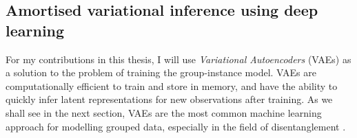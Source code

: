 \documentclass[../thesis.tex]{subfiles}
\begin{document}
\subsection{Amortised variational inference using deep learning}

For my contributions in this thesis, I will use \textit{Variational Autoencoders} (VAEs) \citep{kingma2013auto,rezende2014stochastic} as a solution to the problem of training the group-instance model. VAEs are computationally efficient to train and store in memory, and have the ability to quickly infer latent representations for new observations after training. As we shall see in the next section, VAEs are the most common machine learning approach for modelling grouped data, especially in the field of disentanglement \citep{tschannenRecentAdvancesAutoencoderBased2018}.
\end{document}
